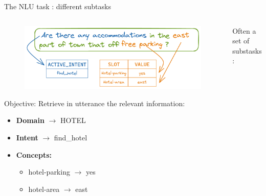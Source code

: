 \documentclass[10pt,aspectratio=169]{beamer}
\begin{document}
\begin{frame}{The NLU task : different subtasks}
    \begin{columns}
        \begin{column}{0.5\textwidth}
            \begin{figure}
                \centering
                \includegraphics[width=1.\textwidth]{media/attent_slot.png}
            \end{figure}
            \begin{block}{Objective:}
                Retrieve in utterance the relevant information: 
            \begin{itemize}
                \item \textbf{Domain} $\longrightarrow$ HOTEL 
                \item \textbf{Intent} $\longrightarrow$ find\_hotel
                \item \textbf{Concepts:} 
                \begin{itemize}
                    \item hotel-parking $\longrightarrow$ yes
                    \item hotel-area $\longrightarrow$ east
                \end{itemize}
            \end{itemize}
            \end{block}
        \end{column}
        \begin{column}{0.5\textwidth}
            \begin{block}{Often a set of substasks: }
                


\end{block}
\end{column}
\end{columns}
\end{frame}
\end{document}
